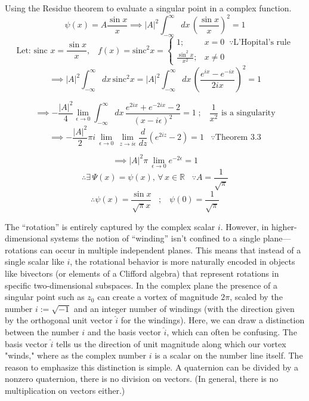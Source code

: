 \documentclass[12pt]{article}
\begin{document}
\begin{example} Using the Residue theorem to evaluate a singular point in a complex function.
\[\psi(x) = A\frac{\sin{x}}{x} \implies |A|^{2}\int_{-\infty}^{\infty} dx\,\left(\frac{\sin{x}}{x}\right)^{2} = 1\]
\[\text{Let: sinc }x = \frac{\sin{x}}{x},\;\;\; f(x) = \text{sinc}^{2} x = \begin{cases}
    1; & x = 0 \;\;\because \text{L'Hopital's rule} \\ 
    \frac{\sin^{2}{x}}{x^{2}}; & x \ne 0
\end{cases}\]
\[\implies |A|^{2} \int_{-\infty}^{\infty} dx\, \text{sinc}^{2}x = |A|^{2} \int_{-\infty}^{\infty} dx\, \left(\frac{e^{ix} - e^{-ix}}{2ix}\right)^{2} = 1  \] 

\[\implies -\frac{|A|^{2}}{4} \lim_{\epsilon\to0}\int_{-\infty}^{\infty} dx\, \frac{e^{2ix} + e^{-2ix}-2}{(x-i\epsilon)^{2}} = 1\;; \;\;\;\frac{1}{x^{2}}\text{ is a singularity}\]
\[\implies -\frac{|A|^{2}}{2}\pi i \,\lim_{\epsilon\to0} \,\lim_{z\to i\epsilon} \frac{d}{dz} (e^{2iz} - 2) = 1\;\;\;\because \text{Theorem 3.3}\]

\[\implies |A|^{2}\pi\,\lim_{\epsilon\to0} e^{-2\epsilon} = 1\]
\[\therefore \exists\, \Psi(x) = \psi(x),\,\forall\,x\in\mathbb{R} \;\;\; \because A = \frac{1}{\sqrt{\pi}}\]
\[\therefore \psi(x) = \frac{\sin{x}}{\sqrt{\pi} x} \;\;\;;\;\;\; \psi(0) = \frac{1}{\sqrt{\pi}} \]
\end{example}

The “rotation” is entirely captured by the complex scalar $i$. However, in higher-dimensional systems the notion of “winding” isn’t confined to a single plane—rotations can occur in multiple independent planes. This means that instead of a single scalar like $i$, the rotational behavior is more naturally encoded in objects like bivectors (or elements of a Clifford algebra) that represent rotations in specific two-dimensional subspaces. In the complex plane the presence of a singular point such as \( z_{0} \) can create a vortex of magnitude \(2\pi\), scaled by the number \(i := \sqrt{-1}\) and an integer number of windings (with the direction given by the orthogonal unit vector \(\hat{i}\) for the windings). Here, we can draw a distinction between the number $i$ and the basis vector $\hat i$, which can often be confusing. The basis vector $\hat i$ tells us the direction of unit magnitude along which our vortex "winds," where as the complex number $i$ is a scalar on the number line itself. The reason to emphasize this distinction is simple. A quaternion can be divided by a nonzero quaternion, there is no division on vectors. (In general, there is no multiplication on vectors either.) \\ 
\end{document}
